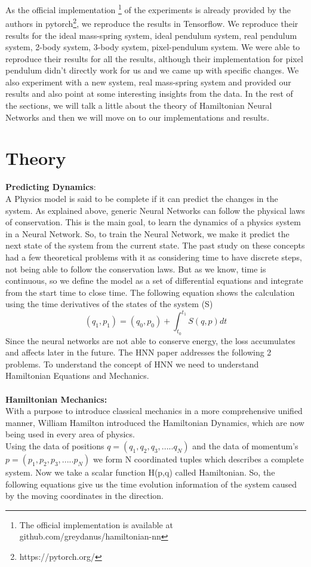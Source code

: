 As the official implementation \footnote{The official implementation is available at github.com/greydanus/hamiltonian-nn} of the experiments is already provided by the authors in pytorch\footnote{https://pytorch.org/}, we reproduce the results in Tensorflow. We reproduce their results for the ideal mass-spring system, ideal pendulum system, real pendulum system, 2-body system, 3-body system, pixel-pendulum system. We were able to reproduce their results for all the results, although their implementation for pixel pendulum didn't directly work for us and we came up with specific changes. We also experiment with a new system, real mass-spring system and provided our results and also point at some interesting insights from the data. In the rest of the sections, we will talk a little about the theory of Hamiltonian Neural Networks and then we will move on to our implementations and results.

\section{Theory}
\textbf{Predicting Dynamics}:\\
A Physics model is said to be complete if it can predict the changes in the system. As explained above, generic Neural Networks can follow the physical laws of conservation. This is the main goal, to learn the dynamics of a physics system in a Neural Network. So, to train the Neural Network, we make it predict the next state of the system from the current state. The past study on these concepts had a few theoretical problems with it as considering time to have discrete steps, not being able to follow the conservation laws. But as we know, time is continuous, so we define the model as a set of differential equations and integrate from the start time to close time. The following equation shows the calculation using the time derivatives of the states of the system (S)
\begin{equation}\label{sam0}
(q_1, p_1) = (q_0, p_0) + \int_{t_0}^{t_1} S(q,p) dt
\end{equation}
Since the neural networks are not able to conserve energy, the loss accumulates and affects later in the future. The HNN paper addresses the following 2 problems. To understand the concept of HNN we need to understand Hamiltonian Equations and Mechanics.\\
\noindent
\\
\textbf{Hamiltonian Mechanics:}\\
With a purpose to introduce classical mechanics in a more comprehensive unified manner, William Hamilton introduced the Hamiltonian Dynamics, which are now being used in every area of physics. \\
Using the data of positions $ q = (q_1, q_2, q_3, .....q_N) $ and the data of momentum's $ p = (p_1, p_2, p_3, .....p_N) $ we form N coordinated tuples which describes a complete system. Now we take a scalar function H(p,q) called Hamiltonian. So, the following equations give us the time evolution information of the system caused by the moving coordinates in the direction.


